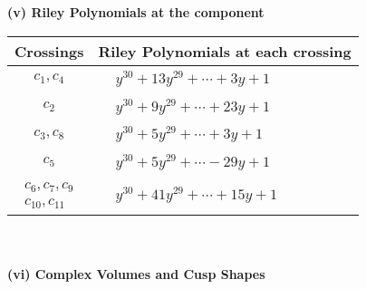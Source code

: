 \documentclass[1p]{elsarticle_modified}
\theoremstyle{definition}
\begin{document}
\newpage\renewcommand{\arraystretch}{1}
\flushleft \textbf{(v) Riley Polynomials at the component}\newline \\
\begin{tabular}{m{50pt}|m{274pt}}
Crossings & \hspace{64pt}Riley Polynomials at each crossing \\
\hline $$\begin{aligned}c_{1},c_{4}\end{aligned}$$&$\begin{aligned}
&y^{30}+13 y^{29}+\cdots+3 y+1
\end{aligned}$\\
\hline $$\begin{aligned}c_{2}\end{aligned}$$&$\begin{aligned}
&y^{30}+9 y^{29}+\cdots+23 y+1
\end{aligned}$\\
\hline $$\begin{aligned}c_{3},c_{8}\end{aligned}$$&$\begin{aligned}
&y^{30}+5 y^{29}+\cdots+3 y+1
\end{aligned}$\\
\hline $$\begin{aligned}c_{5}\end{aligned}$$&$\begin{aligned}
&y^{30}+5 y^{29}+\cdots-29 y+1
\end{aligned}$\\
\hline $$\begin{aligned}c_{6},c_{7},c_{9}\\c_{10},c_{11}\end{aligned}$$&$\begin{aligned}
&y^{30}+41 y^{29}+\cdots+15 y+1
\end{aligned}$\\
\hline
\end{tabular}\\~\\
\newpage\flushleft \textbf{(vi) Complex Volumes and Cusp Shapes}
\end{document}
